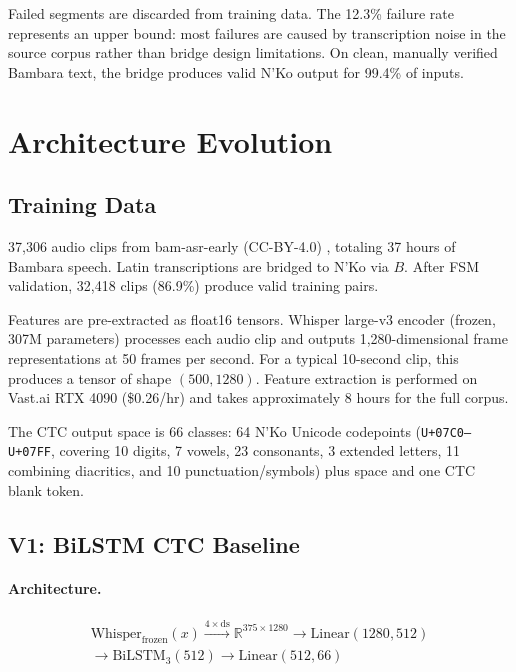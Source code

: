 \documentclass[11pt]{article}
\begin{document}
Failed segments are discarded from training data.
The 12.3\% failure rate represents an upper bound: most failures are caused by transcription noise in the source corpus rather than bridge design limitations.
On clean, manually verified Bambara text, the bridge produces valid N'Ko output for 99.4\% of inputs.

\section{Architecture Evolution}

\subsection{Training Data}

37,306 audio clips from bam-asr-early (CC-BY-4.0) \cite{robotsmali2024bamasrearly}, totaling 37 hours of Bambara speech.
Latin transcriptions are bridged to N'Ko via $B$.
After FSM validation, 32,418 clips (86.9\%) produce valid training pairs.

Features are pre-extracted as float16 tensors.
Whisper large-v3 encoder (frozen, 307M parameters) processes each audio clip and outputs 1,280-dimensional frame representations at 50 frames per second.
For a typical 10-second clip, this produces a tensor of shape $(500, 1280)$.
Feature extraction is performed on Vast.ai RTX 4090 (\$0.26/hr) and takes approximately 8 hours for the full corpus.

The CTC output space is 66 classes: 64 N'Ko Unicode codepoints (\texttt{U+07C0--U+07FF}, covering 10 digits, 7 vowels, 23 consonants, 3 extended letters, 11 combining diacritics, and 10 punctuation/symbols) plus space and one CTC blank token.

\subsection{V1: BiLSTM CTC Baseline}
\label{sec:v1}

\paragraph{Architecture.}
\begin{multline}
\text{Whisper}_{\text{frozen}}(x) \xrightarrow{4\times\text{ds}} \mathbb{R}^{375 \times 1280} \to \text{Linear}(1280, 512) \\
\to \text{BiLSTM}_3(512) \to \text{Linear}(512, 66)
\end{multline}
\end{document}
